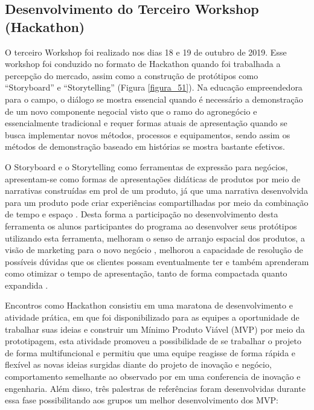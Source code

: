\subsection{Desenvolvimento do Terceiro Workshop (Hackathon)}

O terceiro Workshop foi realizado nos dias 18 e 19 de outubro de 2019. Esse workshop foi conduzido no formato de Hackathon quando foi trabalhada a percepção do mercado, assim como a construção de protótipos como “Storyboard” e “Storytelling” (Figura \ref{figura_51}). Na educação empreendedora para o campo, o diálogo se mostra essencial quando é necessário a demonstração de um novo componente negocial visto que o ramo do agronegócio e essencialmente tradicional e requer formas atuais de apresentação quando se busca implementar novos métodos, processos e equipamentos, sendo assim os métodos de demonstração baseado em histórias se mostra bastante efetivos. 

O Storyboard e o Storytelling como ferramentas de expressão para negócios, apresentam-se como formas de apresentações  didáticas de produtos por meio de narrativas construídas em prol de um produto, já que uma  narrativa desenvolvida para um produto pode criar experiências compartilhadas por meio da combinação de tempo e espaço \cite{langellier_storytelling_2004}. Desta forma a participação no desenvolvimento desta ferramenta os alunos participantes do programa ao desenvolver seus protótipos utilizando esta ferramenta, melhoram o senso de arranjo espacial dos produtos, a visão de marketing para o novo negócio \cite{brenes_improving_2019,brenes_improving_2019}, melhorou a capacidade de resolução de possíveis dúvidas que os clientes possam eventualmente ter e também aprenderam como otimizar o tempo de apresentação, tanto de forma compactada quanto expandida \cite{wahid_storyboard_2018,wu-rorrer_filling_2017}.

Encontros como Hackathon consistiu em uma maratona de desenvolvimento e atividade prática, em que foi disponibilizado para as equipes a oportunidade de trabalhar suas ideias e construir um Mínimo Produto Viável (MVP) por meio da prototipagem, esta atividade promoveu a possibilidade de se trabalhar o projeto de forma multifuncional e permitiu que uma equipe reagisse de forma rápida e flexível as novas ideias surgidas diante do projeto de inovação e negócio, comportamento semelhante ao observado por  em uma conferencia de inovação e engenharia. Além disso, três palestras de referências foram desenvolvidas durante essa fase possibilitando aos grupos um melhor desenvolvimento dos MVP:

